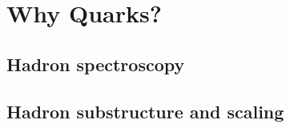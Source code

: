 \documentclass{book}
\begin{document}
\chapter{Why Quarks?}

\section{Hadron spectroscopy}
\section{Hadron substructure and scaling}
\end{document}
